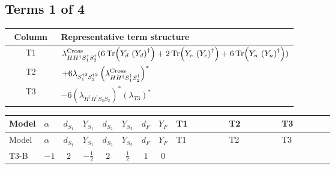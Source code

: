 \documentclass[8pt]{article}
\begin{document}
\begin{landscape}
\subsection*{Terms 1 of 4}
\begin{center}
\begin{tabular}{@{}c >{\raggedright\arraybackslash}p{0.82\linewidth}@{}}
\toprule
Column & Representative term structure \\
\midrule
T1 & \(\displaystyle {\lambda_{H H^\dagger S_1^\dagger S_2^\dagger}^{\rm Cross}} (6 \operatorname{Tr}\!\left({Y_d}\,\left({Y_d}\right)^{\dagger}\right)+2 \operatorname{Tr}\!\left({Y_e}\,\left({Y_e}\right)^{\dagger}\right)+6 \operatorname{Tr}\!\left({Y_u}\,\left({Y_u}\right)^{\dagger}\right))\) \\
\midrule
T2 & \(\displaystyle +6 {\lambda_{S_1^{\dagger 2}S_2^{\dagger 2}}} \left({\lambda_{H H^\dagger S_1^\dagger S_2^\dagger}^{\rm Cross}}\right)^{*}\) \\
\midrule
T3 & \(\displaystyle -6 \left({\lambda_{H^\dagger H^\dagger S_2 S_2}}\right)^{*} \left({\lambda_{T3}}\right)^{*}\) \\
\midrule
\bottomrule
\end{tabular}
\end{center}
\smallskip
\tiny
\begin{longtable}{@{}llcccccc >{\raggedright\arraybackslash}p{0.21\linewidth} >{\raggedright\arraybackslash}p{0.21\linewidth} >{\raggedright\arraybackslash}p{0.21\linewidth}@{}}
\toprule
Model & $\alpha$ & $d_{S_1}$ & $Y_{S_1}$ & $d_{S_2}$ & $Y_{S_2}$ & $d_F$ & $Y_F$ & T1 & T2 & T3 \\
\midrule
\endfirsthead
\toprule
Model & $\alpha$ & $d_{S_1}$ & $Y_{S_1}$ & $d_{S_2}$ & $Y_{S_2}$ & $d_F$ & $Y_F$ & T1 & T2 & T3 \\
\midrule
\endhead
T3-B & $-1$ & $2$ & $-\frac{1}{2}$ & $2$ & $\frac{1}{2}$ & $1$ & $0$ & \scriptsize\adjustbox{max width=\linewidth}{$\begin{gathered} {\lambda_{H H^\dagger S_1^\dagger S_2^\dagger}^{\rm Cross}} (6 \operatorname{Tr}\!\left({Y_d}\,\left({Y_d}\right)^{\dagger}\right)+2 \operatorname{Tr}\!\left({Y_e}\,\left({Y_e}\right)^{\dagger}\right)+6 \operatorname{Tr}\!\left({Y_u}\,\left({Y_u}\right)^{\dagger}\right))\end{gathered}$} & \scriptsize\adjustbox{max width=\linewidth}{$\begin{gathered} +6 {\lambda_{S_1^{\dagger 2}S_2^{\dagger 2}}} \left({\lambda_{H H^\dagger S_1^\dagger S_2^\dagger}^{\rm Cross}}\right)^{*}\end{gathered}$} & \scriptsize\adjustbox{max width=\linewidth}{$\begin{gathered} -6 \left({\lambda_{H^\dagger H^\dagger S_2 S_2}}\right)^{*} \left({\lambda_{T3}}\right)^{*}\end{gathered}$} \\

\end{longtable}
\end{landscape}
\end{document}
